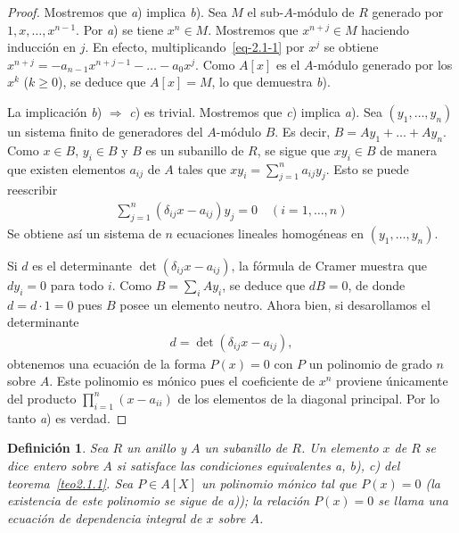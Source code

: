 \documentclass[10pt,oneside,bibtotoc,smallheadings,leqno,a5paper,DIV=12]{scrbook}
\newcommand{\then}{\ensuremath{\Rightarrow}\xspace}
\numberwithin{equation}{section}
\theoremstyle{defi}
\newtheorem{definition}{Definici\'on}
\theoremstyle{enonce}
\theoremstyle{rem}
\numberwithin{theorem}{section}
\numberwithin{proposition}{section}
\numberwithin{definition}{section}
\numberwithin{lemma}{section}
\numberwithin{corollary}{section}
\numberwithin{example}{section}
\numberwithin{footnote}{section}%
\begin{document}
\begin{proof}
Mostremos que {\itshape a}) implica {\itshape b}). Sea $M$ el sub-$A$-m\'odulo de $R$ generado por $1, x, \dots, x^{n-1}$.
Por {\itshape a}) se tiene $x^{n}\in M$. Mostremos que $x^{n+j}\in M$ haciendo inducci\'on en $j$. En efecto,
multiplicando~\eqref{eq-2.1-1} por $x^{j}$ se obtiene $x^{n+j}=-a_{n-1}x^{n+j-1}-\dots-a_{0}x^{j}$.
Como $A[x]$ es el $A$-m\'odulo generado por los $x^{k}$ ($k\geq 0$), se deduce que $A[x] = M$, lo que demuestra
{\itshape b}).

La implicaci\'on {\itshape b}) $\then$ {\itshape c}) es trivial. Mostremos que {\itshape c}) implica {\itshape a}).
Sea $(y_{1},\dots,y_{n})$ un sistema finito de generadores del $A$-m\'odulo $B$. Es decir,
$B = Ay_{1}+\dots+Ay_{n}$. Como $x\in B$, $y_{i}\in B$
y $B$ es un subanillo de $R$, se sigue que $xy_{i}\in B$ de manera que existen elementos $a_{ij}$ de $A$
tales que $xy_{i} = \sum_{j=1}^{n}a_{ij}y_{j}$. Esto se puede reescribir
\begin{gather*}
\sum_{j=1}^{n}(\delta_{ij}x-a_{ij})y_{j} = 0\quad(i=1,\dots,n)
\end{gather*}
Se obtiene as\'i un sistema de $n$ ecuaciones lineales homog\'eneas en $(y_{1},\dots,y_{n})$.

Si $d$ es el determinante $\det(\delta_{ij}x-a_{ij})$, la f\'ormula de
Cramer muestra que $dy_{i} = 0$ para todo $i$. Como $B = \sum_{i}Ay_{i}$, se deduce que
$dB = 0$, de donde $d = d\cdot 1 = 0$ pues $B$ posee un elemento neutro. Ahora bien, si desarollamos el
determinante
\begin{gather*}
d = \det(\delta_{ij}x - a_{ij}),
\end{gather*}
obtenemos una ecuaci\'on de la forma $P(x) = 0$ con $P$ un polinomio de grado $n$ sobre $A$. Este polinomio
es m\'onico pues el coeficiente de $x^{n}$ proviene \'unicamente del producto $\prod_{i=1}^{n}(x-a_{ii})$
de los elementos de la diagonal principal. Por lo tanto {\itshape a}) es verdad.
\end{proof}

\begin{definition}\label{def2.1.1}
Sea $R$ un anillo y $A$ un subanillo de $R$. Un elemento $x$ de $R$ se dice entero sobre $A$ si satisface
las condiciones equivalentes a, b), c) del teorema~\ref{teo2.1.1}.
Sea $P\in A[X]$ un polinomio m\'onico tal que
$P(x) = 0$ (la existencia de este polinomio se sigue de a)); la relaci\'on $P(x) = 0$ se llama una
ecuaci\'on de dependencia integral de $x$ sobre $A$.
\end{definition}
\end{document}
